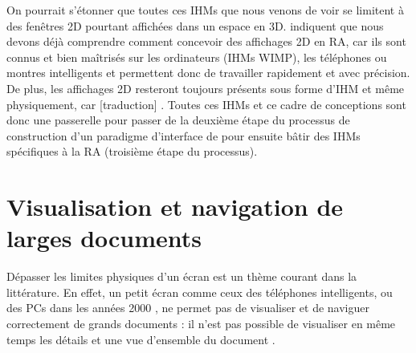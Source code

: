 
On pourrait s'étonner que toutes ces IHMs que nous venons de voir se limitent à des fenêtres 2D pourtant affichées dans un espace en 3D. \cite{Ens2014a} indiquent que nous devons déjà comprendre comment concevoir des affichages 2D en RA, car ils sont connus et bien maîtrisés sur les ordinateurs (IHMs WIMP), les téléphones ou montres intelligents et permettent donc de travailler rapidement et avec précision. De plus, les affichages 2D resteront toujours présents sous forme d'IHM et même physiquement, car [traduction]  \citep[p. 1]{Ens2014a}. Toutes ces IHMs et ce cadre de conceptions sont donc une passerelle pour passer de la deuxième étape du processus de construction d'un paradigme d'interface de \cite{Billinghurst2005} pour ensuite bâtir des IHMs spécifiques à la RA (troisième étape du processus).


\section{Visualisation et navigation de larges documents}
\label{sec:litterature_large_documents}
Dépasser les limites physiques d'un écran est un thème courant dans la littérature. En effet, un petit écran comme ceux des téléphones intelligents, ou des PCs dans les années 2000 \citep{Baudisch2002}, ne permet pas de visualiser et de naviguer correctement de grands documents : il n'est pas possible de visualiser en même temps les détails et une vue d'ensemble du document .


